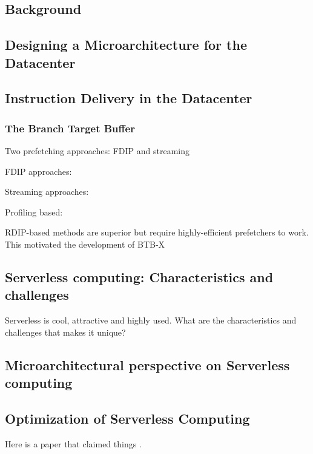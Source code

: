 \documentclass[../main.tex]{subfiles}
\begin{document}
\ifx\chapincluded\undefined
  \begin{refsection}
 \fi


\chapter{Background}
\label{chap:background}

\section{Designing a Microarchitecture for the Datacenter}
\cite{kanev15_profil,ferdman12_clear_cloud}


\section{Instruction Delivery in the Datacenter}

\subsection{The Branch Target Buffer}
\label{chap:btb-hebackground}


Two prefetching approaches: FDIP and streaming


FDIP approaches: \cite{reinman99_fetch_direc_instr_prefet, kumar17_boomer,kumar18_blast_throug_front_end_bottl_with_shotg,kumar20_shoot_down_server_front_end_bottl}

Streaming approaches:
\cite{ferdman08_tempor,ferdman11_proac_instr_fetch,kaynak13_shift,kaynak15_confl}

Profiling based:

RDIP-based methods are superior but require highly-efficient prefetchers to work. This motivated the development of BTB-X



\section{Serverless computing: Characteristics and challenges}
Serverless is cool, attractive and highly used. What are the characteristics and challenges that makes it unique?


\section{Microarchitectural perspective on Serverless computing}



\section{Optimization of Serverless Computing}


Here is a paper that claimed things \cite{kanev15_profil}.



\ifx\chapincluded\undefined
  \printbibliography
  \end{refsection}
 \fi
\end{document}
